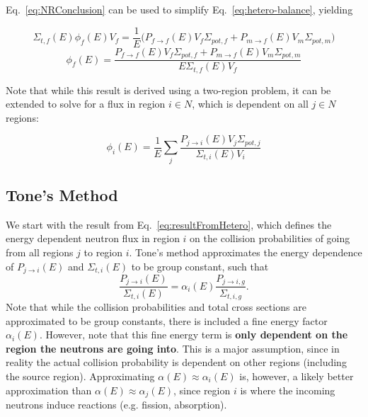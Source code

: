 \documentclass[10pt]{article}
\begin{document}
Eq.~\ref{eq:NRConclusion} can be used to simplify Eq.~\ref{eq:hetero-balance}, yielding


\begin{equation}\Sigma_{t,f}(E)\phi_{f}(E)V_{f}=\frac{1}{E}\Big(P_{f\rightarrow f}(E)V_{f}\Sigma_{pot,f}+P_{m\rightarrow f}(E)V_{m}\Sigma_{pot,m}\Big)\end{equation}
\begin{equation}\phi_{f}(E)=\frac{P_{f\rightarrow f}(E)V_f\Sigma_{pot,f}+P_{m\rightarrow f}(E)V_m\Sigma_{pot,m}}{E\Sigma_{t,f}(E)V_f}\end{equation}

Note that while this result is derived using a two-region problem, it can be extended to solve for a flux in region $i\in N$, which is dependent on all $j\in N$ regions:

\begin{equation}\phi_{i}(E)=\frac{1}{E}\sum\limits_j\frac{P_{j\rightarrow i}(E)V_{j}\Sigma_{pot,j}}{\Sigma_{t,i}(E)V_{i}}\label{eq:resultFromHetero}\end{equation}




  \subsection{Tone's Method}\label{sec:tone}
We start with the result from Eq.~\ref{eq:resultFromHetero}, which defines the energy dependent neutron flux in region $i$ on the collision probabilities of going from all regions $j$ to region $i$. Tone's method approximates the energy dependence of $P_{j\rightarrow i}(E)$ and $\Sigma_{t,i}(E)$ to be group constant, such that 
\begin{equation}\frac{P_{j\rightarrow i}(E)}{\Sigma_{t,i}(E)}=\alpha_{i}(E)\frac{P_{j\rightarrow i,g}}{\Sigma_{t,i,g}}.\label{eq:tonesApprox}\end{equation}
  Note that while the collision probabilities and total cross sections are approximated to be group constants, there is included a fine energy factor $\alpha_i(E)$. However, note that this fine energy term is \textbf{only dependent on the region the neutrons are going into}. This is a major assumption, since in reality the actual collision probability is dependent on other regions (including the source region). Approximating $\alpha(E)\approx\alpha_i(E)$ is, however, a likely better approximation than $\alpha(E)\approx\alpha_j(E)$, since region $i$ is where the incoming neutrons induce reactions (e.g. fission, absorption).
\end{document}
